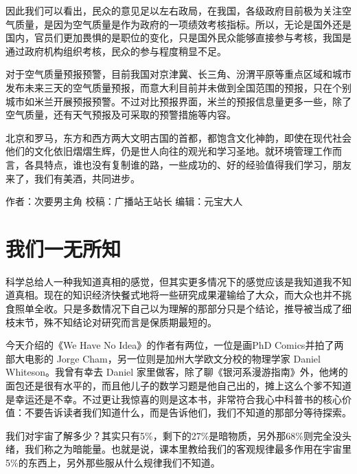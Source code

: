 \documentclass[
]{book}
\begin{document}
因此我们可以看出，民众的意见足以左右政局，在我国，各级政府目前极为关注空气质量，是因为空气质量是作为政府的一项绩效考核指标。所以，无论是国外还是国内，官员们更加畏惧的是职位的变化，只是国外民众能够直接参与考核，我国是通过政府机构组织考核，民众的参与程度稍显不足。

对于空气质量预报预警，目前我国对京津冀、长三角、汾渭平原等重点区域和城市发布未来三天的空气质量预报，而意大利目前并未做到全国范围的预报，只在个别城市如米兰开展预报预警。不过对比预报界面，米兰的预报信息量更多一些，除了空气质量，还有天气预报及可采取的预警措施等内容。

北京和罗马，东方和西方两大文明古国的首都，都饱含文化神韵，即使在现代社会他们的文化依旧熠熠生辉，仍是世人向往的观光和学习圣地。就环境管理工作而言，各具特点，谁也没有复制谁的路，一些成功的、好的经验值得我们学习，朋友来了，我们有美酒，共同进步。

作者：次要男主角
校稿：广播站王站长
编辑：元宝大人

\hypertarget{ux6211ux4eecux4e00ux65e0ux6240ux77e5}{%
\section{我们一无所知}\label{ux6211ux4eecux4e00ux65e0ux6240ux77e5}}

科学总给人一种我知道真相的感觉，但其实更多情况下的感觉应该是我知道我不知道真相。现在的知识经济快餐式地将一些研究成果灌输给了大众，而大众也并不挑食照单全收。只是多数情况下自己以为理解的那部分只是个结论，推导被当成了细枝末节，殊不知结论对研究而言是保质期最短的。

今天介绍的《We Have No Idea》的作者有两位，一位是画PhD Comics并拍了两部大电影的 Jorge Cham，另一位则是加州大学欧文分校的物理学家 Daniel Whiteson。我曾有幸去 Daniel 家里做客，除了聊《银河系漫游指南》外，他烤的面包还是很有水平的，而且他儿子的数学习题是他自己出的，摊上这么个爹不知道是幸运还是不幸。不过更让我惊喜的则是这本书，非常符合我心中科普书的核心价值：不要告诉读者我们知道什么，而是告诉他们，我们不知道的那部分等待探索。

我们对宇宙了解多少？其实只有5\%，剩下的27\%是暗物质，另外那68\%则完全没头绪，我们称之为暗能量。也就是说，课本里教给我们的客观规律最多作用在宇宙里5\%的东西上，另外那些服从什么规律我们不知道。
\end{document}
